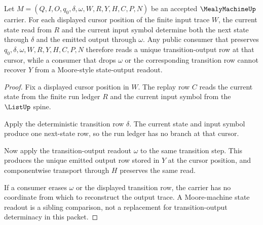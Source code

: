 \begin{theorem}
\label{thm:mealy-machine-output-transition-determinacy}
Let $M=(Q,I,O,q_0,\delta,\omega,W,R,Y,H,C,P,N)$ be an accepted $\MealyMachineUp$ carrier. For each displayed cursor position of the finite input trace $W$, the current state read from $R$ and the current input symbol determine both the next state through $\delta$ and the emitted output through $\omega$. Any public consumer that preserves $q_0,\delta,\omega,W,R,Y,H,C,P,N$ therefore reads a unique transition-output row at that cursor, while a consumer that drops $\omega$ or the corresponding transition row cannot recover $Y$ from a Moore-style state-output readout.
\end{theorem}
\begin{proof}
Fix a displayed cursor position in $W$. The replay row $C$ reads the current state from the finite run ledger $R$ and the current input symbol from the $\ListUp$ spine.

Apply the deterministic transition row $\delta$. The current state and input symbol produce one next-state row, so the run ledger has no branch at that cursor.

Now apply the transition-output readout $\omega$ to the same transition step. This produces the unique emitted output row stored in $Y$ at the cursor position, and componentwise transport through $H$ preserves the same read.

If a consumer erases $\omega$ or the displayed transition row, the carrier has no coordinate from which to reconstruct the output trace. A Moore-machine state readout is a sibling comparison, not a replacement for transition-output determinacy in this packet.
\end{proof}


\begin{closurestatus}{\MealyMachineUp}
  \theoryclosure{\seedClosure}
  \formalstatus{\formalTargetV}
\end{closurestatus}

